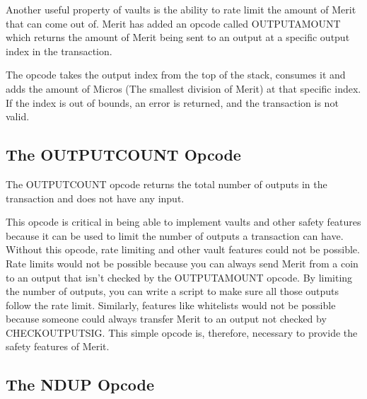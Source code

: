 \documentclass{article}
\begin{document}
Another useful property of vaults is the ability to rate limit the amount of Merit
that can come out of. Merit has added an opcode called OUTPUTAMOUNT which
returns the amount of Merit being sent to an output at a specific output index in
the transaction.

The opcode takes the output index from the top of the stack, consumes it and adds the
amount of Micros (The smallest division of Merit) at that specific index. If the index
is out of bounds, an error is returned, and the transaction is not valid.

\subsection{The OUTPUTCOUNT Opcode}

\begin{center}
\end{center}

The OUTPUTCOUNT opcode returns the total number of outputs in the transaction and
does not have any input.

This opcode is critical in being able to implement vaults and other safety features
because it can be used to limit the number of outputs a transaction can have.
Without this opcode, rate limiting and other vault features could not be possible.
Rate limits would not be possible because you can always send Merit from a coin
to an output that isn't checked by the OUTPUTAMOUNT opcode. By limiting the number
of outputs, you can write a script to make sure all those outputs follow the rate
limit. Similarly, features like whitelists would not be possible because someone
could always transfer Merit to an output not checked by CHECKOUTPUTSIG. This
simple opcode is, therefore, necessary to provide the safety features of Merit.

\subsection{The NDUP Opcode}

\begin{center}
\end{center}
\end{document}
